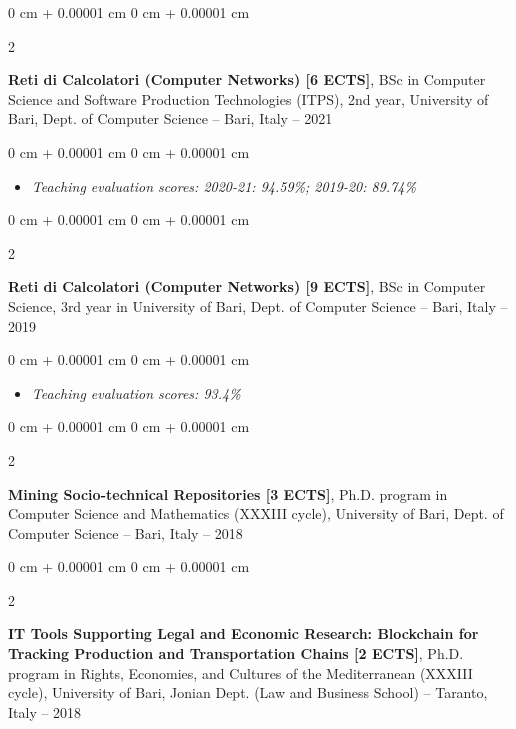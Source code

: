 \documentclass[10pt, a4paper]{article}
\newenvironment{highlights}{
    \begin{itemize}[
        topsep=0.10 cm,
        parsep=0.10 cm,
        partopsep=0pt,
        itemsep=0pt,
        leftmargin=0 cm + 10pt
    ]
}{
    \end{itemize}
} %
\newenvironment{onecolentry}{
    \begin{adjustwidth}{
        0 cm + 0.00001 cm
    }{
        0 cm + 0.00001 cm
    }
}{
    \end{adjustwidth}
} %
\newenvironment{twocolentry}[2][]{
    \onecolentry
    \def\secondColumn{#2}
    \setcolumnwidth{\fill, 4.5 cm}
    \begin{paracol}{2}
}{
    \switchcolumn \raggedleft \secondColumn
    \end{paracol}
    \endonecolentry
} %
\begin{document}
        \begin{twocolentry}{
            2019 – 2021
        }
            \textbf{Reti di Calcolatori (Computer Networks) [6 ECTS]}, BSc in Computer Science and Software Production Technologies (ITPS), 2nd year, University of Bari, Dept. of Computer Science -- Bari, Italy\end{twocolentry}

        \vspace{0.10 cm}
        \begin{onecolentry}
            \begin{highlights}
                \item \textit{Teaching evaluation scores: 2020-21: 94.59\%; 2019-20: 89.74\%}
            \end{highlights}
        \end{onecolentry}


        \vspace{0.2 cm}

        \begin{twocolentry}{
            2018 – 2019
        }
            \textbf{Reti di Calcolatori (Computer Networks) [9 ECTS]}, BSc in Computer Science, 3rd year in University of Bari, Dept. of Computer Science -- Bari, Italy\end{twocolentry}

        \vspace{0.10 cm}
        \begin{onecolentry}
            \begin{highlights}
                \item \textit{Teaching evaluation scores: 93.4\%}
            \end{highlights}
        \end{onecolentry}


        \vspace{0.2 cm}

        \begin{twocolentry}{
            2017 – 2018
        }
            \textbf{Mining Socio-technical Repositories [3 ECTS]}, Ph.D. program in Computer Science and Mathematics (XXXIII cycle), University of Bari, Dept. of Computer Science -- Bari, Italy\end{twocolentry}



        \vspace{0.2 cm}

        \begin{twocolentry}{
            2017 – 2018
        }
            \textbf{IT Tools Supporting Legal and Economic Research: Blockchain for Tracking Production and Transportation Chains [2 ECTS]}, Ph.D. program in Rights, Economies, and Cultures of the Mediterranean (XXXIII cycle), University of Bari, Jonian Dept. (Law and Business School) -- Taranto, Italy\end{twocolentry}
\end{document}
